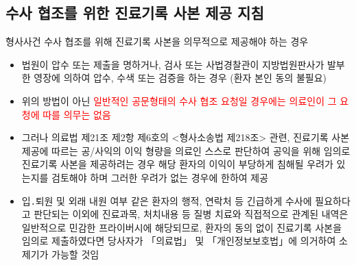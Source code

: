 
\subsection{수사 협조를 위한 진료기록 사본 제공 지침}
형사사건 수사 협조를 위해 진료기록 사본을 의무적으로 제공해야 하는 경우
\begin{mdframed}[linecolor=blue,middlelinewidth=2]
\begin{itemize}\tightlist
\item 법원이 압수 또는 제출을 명하거나, 검사 또는 사법경찰관이 지방법원판사가 발부한 영장에 의하여 압수, 수색 또는 검증을 하는 경우 (환자 본인 동의 불필요) 
\item 위의 방법이 아닌 \textcolor{red}{일반적인 공문형태의 수사 협조 요청일 경우에는 의료인이 그 요청에 따를 의무는 없음}
\item 그러나 의료법 제21조 제2항 제6호의 <형사소송법 제218조> 관련, 진료기록 사본 제공에 따르는 공/사익의 이익 형량을 의료인 스스로 판단하여 공익을 위해 임의로 진료기록 사본을 제공하려는 경우  해당 환자의 이익이 부당하게 침해될 우려가 있는지를 검토해야 하며 그러한 우려가 없는 경우에 한하여 제공
\item 입․퇴원 및 외래 내원 여부 같은 환자의 행적, 연락처 등 긴급하게 수사에 필요하다고 판단되는 이외에 진료과목, 처치내용 등 질병 치료와 직접적으로 관계된 내역은 일반적으로 민감한 프라이버시에 해당되므로,  환자의 동의 없이 진료기록 사본을 임의로 제출하였다면 당사자가 「의료법」 및 「개인정보보호법」에 의거하여 소제기가 가능할 것임
\end{itemize}
\end{mdframed}
